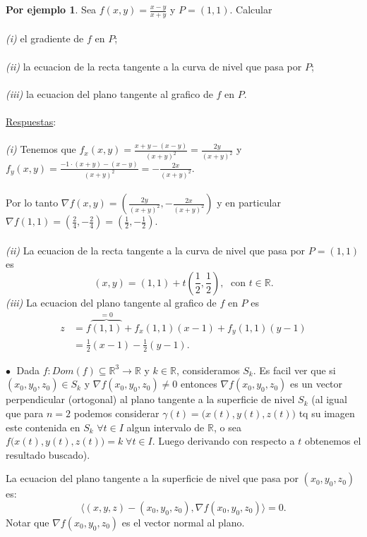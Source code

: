 \documentclass{article}
\theoremstyle{definition}
\theoremstyle{definition}
\newtheorem*{ej}{Por ejemplo}
\theoremstyle{remark}
\newcommand\bl{$\bullet\;$}
\begin{document}
\begin{ej}
  Sea $f(x,y)=\frac{x-y}{x+y}$ y $P=(1,1)$. Calcular \\\\
  \emph{(i)\phantom{ii}} el gradiente de $f$ en $P$;\\\\
  \emph{(ii)\phantom{i}} la ecuacion de la recta tangente a la curva de nivel que pasa por $P$; \\\\
  \emph{(iii)} la ecuacion del plano tangente al grafico de $f$ en $P$.\\\\
  \underline{Respuestas}:\\\\ \emph{(i)\phantom{ii}} Tenemos que \mbox{$f_x(x,y)=\frac{x+y-(x-y)}{(x+y)^2}=\frac{2y}{(x+y)^2}$} y \mbox{$f_y(x,y)=\frac{-1\cdot(x+y)-(x-y)}{(x+y)^2}=-\frac{2x}{(x+y)^2}.$} \\\\ Por lo tanto $\nabla f(x,y)=\left(\frac{2y}{(x+y)^2},-\frac{2x}{(x+y)^2}\right)$ y en particular \mbox{$\nabla f(1,1)=\left(\frac{2}{4},-\frac{2}{4}\right)=\left(\frac{1}{2},-\frac{1}{2}\right).$} \\\\
  \emph{(ii)\phantom{i}} La ecuacion de la recta tangente a la curva de nivel que pasa por $P=(1,1)$ es \[
    (x,y)=(1,1)+t\left(\frac{1}{2},\frac{1}{2}\right), \; \text{ con } t \in \mathbb{R}.
    \]\emph{(iii)} La ecuacion del plano tangente al grafico de $f$ en $P$ es \[\begin{aligned}
    z & =f\overbrace{(1,1)}^{=0}+f_x(1,1)(x-1)+f_y(1,1)(y-1) \\
     & = \frac{1}{2}(x-1)-\frac{1}{2}(y-1).
  \end{aligned}\]
\end{ej} 
\textcolor{rojop2}{\bl} Dada $f : Dom(f) \subseteq \mathbb{R}^3 \to \mathbb{R}$ y $k \in \mathbb{R}$, consideramos $S_k$. Es facil ver que si $(x_0,y_0,z_0) \in S_k$ y $\nabla f(x_0,y_0,z_0) \neq 0$ entonces $\nabla f(x_0,y_0,z_0)$ es un vector perpendicular (ortogonal) al plano tangente a la superficie de nivel $S_k$ (al igual que para $n=2$ podemos considerar $\gamma(t)=\big(x(t),y(t),z(t)\big)$ tq su imagen este contenida en $S_k$ \; $\forall t \in I$ algun intervalo de $\mathbb{R}$, o sea $f\big(x(t),y(t),z(t)\big)=k \; \forall t \in I$. Luego derivando con respecto a $t$ obtenemos el resultado buscado). \pagebreak 
\begin{defi}
  La ecuacion del plano tangente a la superficie de nivel que pasa por $(x_0,y_0,z_0)$ es: \[
\big\langle (x,y,z)-(x_0,y_0,z_0), \nabla f(x_0,y_0,z_0) \big\rangle =0.
  \] Notar que $\nabla f(x_0,y_0,z_0)$ es el vector normal al plano.
\end{defi}
\end{document}
